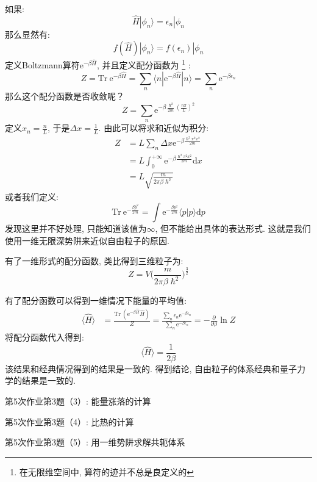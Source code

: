         如果:
        \[ \hat{H} | \phi_n \rangle = \epsilon_n |\phi_n \]
        那么显然有:
        \[ f(\hat{H})|\phi_n \rangle = f(\epsilon_n)|\phi_n \]
        定义Boltzmann算符$\mathrm{e}^{-\beta\hat{H}}$, 并且定义配分函数为
        \footnote{在无限维空间中, 算符的迹并不总是良定义的}
        :
        \[ Z = \mathrm{Tr}\  \mathrm{e}^{-\beta \hat{H}} = \sum_n \langle n| \mathrm{e}^{-\beta \hat{H}} | n \rangle = \sum_n \mathrm{e}^{-\beta \epsilon_n }\]
        那么这个配分函数是否收敛呢？
        \[ Z = \sum_n \mathrm{e}^{-\beta \frac {\hslash^2}{2m} (\frac {n\pi}L)^2} \]
        定义$x_n = \frac nL$, 于是$\Delta x = \frac 1L$. 由此可以将求和近似为积分: 
        \begin{equation}\begin{aligned}
            Z &= L \sum_n \Delta x \mathrm{e}^{-\beta \frac {\hslash^2\pi^2 x^2}{2m} }\\
            &= L \int_0^{+\infty} \mathrm{e}^{-\beta \frac {\hslash^2\pi^2 x^2}{2m}} \mathrm{d}x\\
            &= L\sqrt{\frac m{2\pi \beta \hslash^2}}
        \end{aligned}\end{equation}
        或者我们定义: 
        \[ \mathrm{Tr} \ \mathrm{e}^{-\frac {\beta \hat{p}^2}{2m}} = \int \mathrm{e}^{-\frac {\beta p^2}{2m}} \langle p|p\rangle \mathrm{d}p \]
        发现这里并不好处理, 只能知道该值为$\infty$, 但不能给出具体的表达形式.
        这就是我们使用一维无限深势阱来近似自由粒子的原因.

        有了一维形式的配分函数, 类比得到三维粒子为:
        \[ Z = V \bigg(\frac m{2\pi \beta \hslash^2}\bigg)^{\frac 32} \]

        有了配分函数可以得到一维情况下能量的平均值:
        \begin{equation}\begin{aligned}
            \langle \hat{H} \rangle &= \frac {\mathrm{Tr} \ (\mathrm{e}^{-\beta \hat{H}} \hat{H})}Z
            = \frac {\sum_n \epsilon_n \mathrm{e}^{-\beta \epsilon_n}}{\sum_n \mathrm{e}^{-\beta \epsilon_n}}
            = -\frac {\partial}{\partial \beta} \ln{Z}
        \end{aligned}\end{equation}
        将配分函数代入得到: 
        \[ \langle \hat{H} \rangle = \frac 1{2\beta} \]
        该结果和经典情况得到的结果是一致的. 得到结论, 
        自由粒子的体系经典和量子力学的结果是一致的.
        \begin{asg}
            第5次作业第3题（3）: 能量涨落的计算
        \end{asg}
        \begin{asg}
            第5次作业第3题（4）: 比热的计算
        \end{asg}
        \begin{asg}
            第5次作业第3题（5）: 用一维势阱求解共轭体系
        \end{asg}

